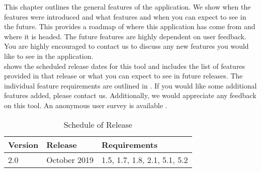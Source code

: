 This chapter outlines the general features of the \texttt{\getsoftwarename{}} application. We show when the features were introduced and what features and when you can expect to see in the future. This provides a roadmap of where this application has come from and where it is headed. The future features are highly dependent on user feedback. You are highly encouraged to contact us to discuss any new features you would like to see in the application.\\

 shows the scheduled release dates for this tool and includes the list of features provided in that release or what you can expect to see in future releases. The individual feature requirements are outlined in . If you would like some additional features added, please contact us.
Additionally, we would appreciate any feedback on this tool. An anonymous
user survey is available . \\

\begin{table}[hbt!]                    
  \centering
\begin{adjustbox}{max width=\textwidth}            
  \begin{tabular}{lll}                    
    \toprule          
      Version & 	Release	 & Requirements \\  \hline
      2.0	 & October 2019 & 1.5, 1.7, 1.8, 2.1, 5.1, 5.2\\  \hline
  \end{tabular}
\end{adjustbox}
  \caption{Schedule of Release}             
  \label{tab:schedule}                 
\end{table}


